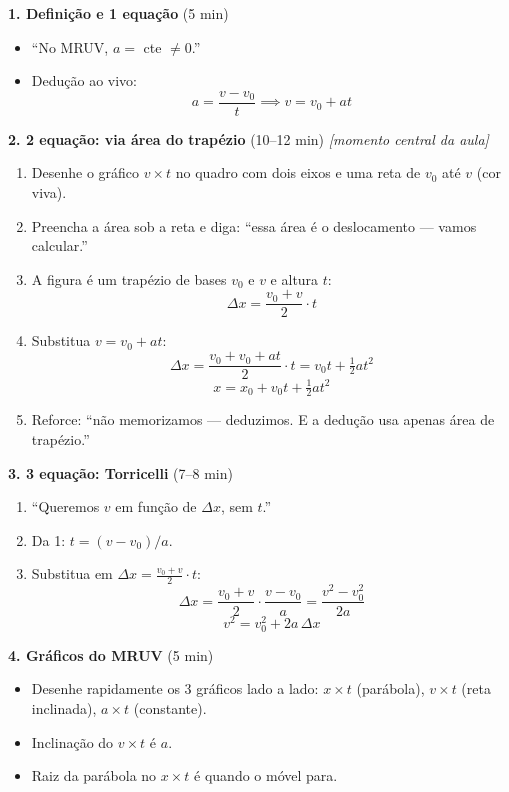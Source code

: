 \documentclass[12pt,a4paper]{article}
\begin{document}
\begin{tcolorbox}[quadrobox]
  \textbf{1. Defini\c{c}\~ao e 1\textordfeminine{} equa\c{c}\~ao} (5 min)
  \begin{itemize}[nosep]
    \item ``No MRUV, $a = $ cte $\neq 0$.''
    \item Dedução ao vivo:
    \[
      a = \frac{v - v_0}{t} \implies \boxed{v = v_0 + at}
    \]
  \end{itemize}

  \medskip
  \textbf{2. 2\textordfeminine{} equa\c{c}\~ao: via \'area do trap\'ezio}
  (10--12 min) \textit{[momento central da aula]}
  \begin{enumerate}[nosep]
    \item Desenhe o gr\'afico $v \times t$ no quadro com dois eixos e
          uma reta de $v_0$ at\'e $v$ (cor viva).
    \item Preencha a \'area sob a reta e diga: ``essa \'area \'e o
          deslocamento --- vamos calcular.''
    \item A figura \'e um trap\'ezio de bases $v_0$ e $v$ e altura $t$:
    \[
      \Delta x = \frac{v_0 + v}{2} \cdot t
    \]
    \item Substitua $v = v_0 + at$:
    \[
      \Delta x = \frac{v_0 + v_0 + at}{2}\cdot t = v_0 t + \tfrac{1}{2}at^2
    \]
    \[
      \boxed{x = x_0 + v_0 t + \tfrac{1}{2}at^2}
    \]
    \item Reforce: ``n\~ao memorizamos --- deduzimos. E a dedu\c{c}\~ao
          usa apenas \'area de trap\'ezio.''
  \end{enumerate}

  \medskip
  \textbf{3. 3\textordfeminine{} equa\c{c}\~ao: Torricelli} (7--8 min)
  \begin{enumerate}[nosep]
    \item ``Queremos $v$ em fun\c{c}\~ao de $\Delta x$, sem $t$.''
    \item Da 1\textordfeminine{}: $t = (v - v_0)/a$.
    \item Substitua em $\Delta x = \tfrac{v_0+v}{2}\cdot t$:
    \[
      \Delta x = \frac{v_0+v}{2}\cdot\frac{v-v_0}{a}
               = \frac{v^2-v_0^2}{2a}
    \]
    \[
      \boxed{v^2 = v_0^2 + 2a\,\Delta x}
    \]
  \end{enumerate}

  \medskip
  \textbf{4. Gr\'aficos do MRUV} (5 min)
  \begin{itemize}[nosep]
    \item Desenhe rapidamente os 3 gr\'aficos lado a lado:
          $x\times t$ (par\'abola), $v\times t$ (reta inclinada),
          $a\times t$ (constante).
    \item Inclina\c{c}\~ao do $v\times t$ \'e $a$.
    \item Raiz da par\'abola no $x\times t$ \'e quando o m\'ovel para.
  \end{itemize}


\end{tcolorbox}
\end{document}
